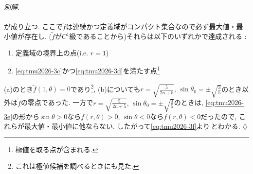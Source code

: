 \documentclass[titlepage]{jsarticle}
\numberwithin{equation}{section}
\newenvironment{kaitou}[1][解]{%
\begin{proofbox}%
\textit{#1. }\ignorespaces
}{%
\hfill$\diamondsuit$%
\end{proofbox}%
}
\begin{document}
\begin{kaitou}[別解]
\begin{align}
\label{eq:tmu2026-3f}
\end{align}
が成り立つ. ここで$\tilde{f}$は連続かつ定義域がコンパクト集合なので必ず最大値・最小値が存在し, ($\tilde{f}$が$C^1$級であることから)それらは以下のいずれかで達成される : 
\begin{enumerate}[label=(\alph*)]
\item 定義域の境界上の点(i.e. $r = 1$)
\item \eqref{eq:tmu2026-3c}かつ\eqref{eq:tmu2026-3d}を満たす点\footnote{極値を取る点が含まれる.}
\end{enumerate}
(a)のとき$\tilde{f}(1, \theta) = 0$であり\footnote{これは極値候補を調べるときにも見た.}, (b)についても$r = \sqrt{\frac{5}{2n + 5}},\,\sin\theta_0 = \pm\sqrt{\frac{3}{5}}$のとき以外は$\tilde{f}$の零点であった. 一方で$r = \sqrt{\frac{5}{2n + 5}},\,\sin\theta_0 = \pm\sqrt{\frac{3}{5}}$のときは, \eqref{eq:tmu2026-3e}の形から$\sin\theta > 0$なら$\tilde{f}(r, \theta) > 0$, $\sin\theta < 0$なら$\tilde{f}(r, \theta) < 0$だったので, これらが最大値・最小値に他ならない. したがって\eqref{eq:tmu2026-3f}より\,とわかる.
\end{kaitou}
\end{document}
